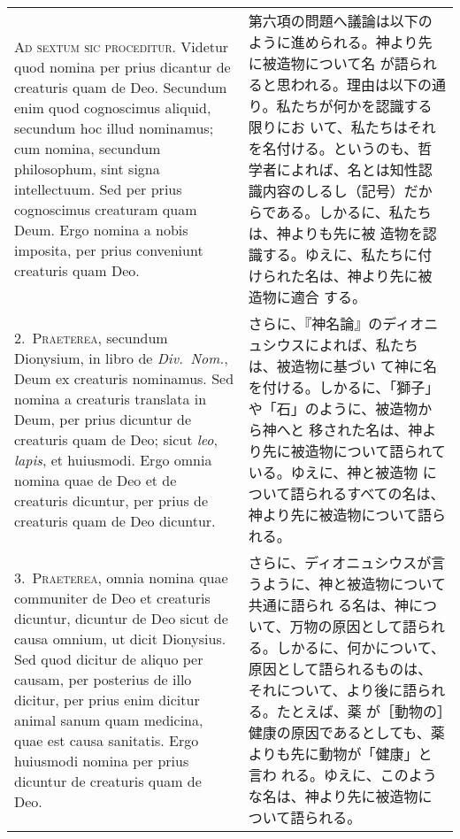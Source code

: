 \documentclass[10pt]{jsarticle}
\begin{document}
\begin{longtable}{p{21em}p{21em}}
{\huge A}{\scshape d sextum sic proceditur}. Videtur quod nomina per
prius dicantur de creaturis quam de Deo. Secundum enim quod
cognoscimus aliquid, secundum hoc illud nominamus; cum nomina,
secundum philosophum, sint signa intellectuum. Sed per prius
cognoscimus creaturam quam Deum. Ergo nomina a nobis imposita, per
prius conveniunt creaturis quam Deo.

&

第六項の問題へ議論は以下のように進められる。神より先に被造物について名
が語られると思われる。理由は以下の通り。私たちが何かを認識する限りにお
いて、私たちはそれを名付ける。というのも、哲学者によれば、名とは知性認
識内容のしるし（記号）だからである。しかるに、私たちは、神よりも先に被
造物を認識する。ゆえに、私たちに付けられた名は、神より先に被造物に適合
する。

\\

2.~{\scshape Praeterea}, secundum Dionysium, in libro de {\itshape
Div.~Nom.}, Deum ex creaturis nominamus. Sed nomina a creaturis
translata in Deum, per prius dicuntur de creaturis quam de Deo; sicut
{\itshape leo}, {\itshape lapis}, et huiusmodi. Ergo omnia nomina quae
de Deo et de creaturis dicuntur, per prius de creaturis quam de Deo
dicuntur.

&

さらに、『神名論』のディオニュシウスによれば、私たちは、被造物に基づい
て神に名を付ける。しかるに、「獅子」や「石」のように、被造物から神へと
移された名は、神より先に被造物について語られている。ゆえに、神と被造物
について語られるすべての名は、神より先に被造物について語られる。

\\

3.~{\scshape Praeterea}, omnia nomina quae communiter de Deo et
creaturis dicuntur, dicuntur de Deo sicut de causa omnium, ut dicit
Dionysius. Sed quod dicitur de aliquo per causam, per posterius de
illo dicitur, per prius enim dicitur animal sanum quam medicina, quae
est causa sanitatis. Ergo huiusmodi nomina per prius dicuntur de
creaturis quam de Deo.

&

さらに、ディオニュシウスが言うように、神と被造物について共通に語られ
る名は、神について、万物の原因として語られる。しかるに、何かについて、
原因として語られるものは、それについて、より後に語られる。たとえば、薬
が［動物の］健康の原因であるとしても、薬よりも先に動物が「健康」と言わ
れる。ゆえに、このような名は、神より先に被造物について語られる。


\end{longtable}
\end{document}
